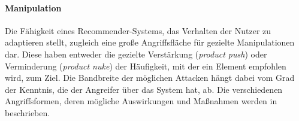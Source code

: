 \paragraph{Manipulation} Die Fähigkeit eines Recommender-Systems, das Verhalten der Nutzer zu adaptieren stellt, zugleich eine große Angriffsfläche für gezielte Manipulationen dar. Diese haben entweder die gezielte Verstärkung (\textit{product push}) oder Verminderung (\textit{product nuke}) der Häufigkeit, mit der ein Element empfohlen wird, zum Ziel. Die Bandbreite der möglichen Attacken hängt dabei vom Grad der Kenntnis, die der Angreifer über das System hat, ab. Die verschiedenen Angriffsformen, deren mögliche Auswirkungen und Maßnahmen werden in \citep{hb_25} beschrieben. 


